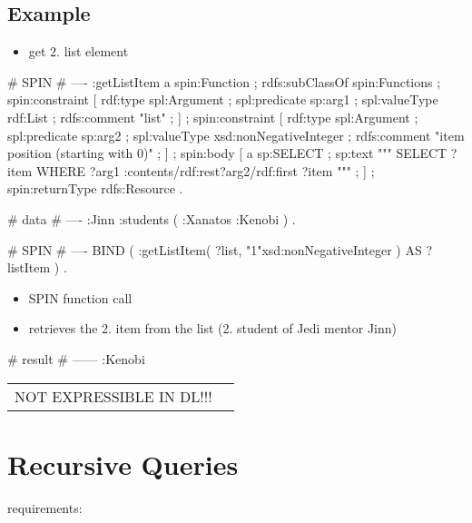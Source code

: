 \documentclass{llncs}
\newenvironment{DL}{
	\begin{center}
  \begin{tabular}{r l}

}{
  \end{tabular}
	\end{center}
}
\begin{document}
\subsection{Example}

\begin{itemize}
	\item get 2. list element
\end{itemize}

\begin{ex}
# SPIN
# ----
:getListItem
    a spin:Function ; rdfs:subClassOf spin:Functions ;
    spin:constraint [
        rdf:type spl:Argument ;
        spl:predicate sp:arg1 ;
        spl:valueType rdf:List ;
        rdfs:comment "list" ; ] ;
    spin:constraint [
        rdf:type spl:Argument ;
        spl:predicate sp:arg2 ;
        spl:valueType xsd:nonNegativeInteger ;
        rdfs:comment "item position (starting with 0)" ; ] ;
    spin:body [
        a sp:SELECT ;
        sp:text """
            SELECT ?item
            WHERE {
                ?arg1 :contents/rdf:rest{?arg2}/rdf:first ?item } """ ; ] ;
    spin:returnType rdfs:Resource .
\end{ex}

\begin{ex}
# data
# ----
:Jinn :students 
     ( :Xanatos :Kenobi ) . 
\end{ex}

\begin{ex}
# SPIN
# ----
BIND ( :getListItem( ?list, "1"xsd:nonNegativeInteger ) AS ?listItem ) .
\end{ex}

\begin{itemize}
  \item SPIN function call
	\item retrieves the 2. item from the list (2. student of Jedi mentor Jinn)
\end{itemize}

\begin{ex}
# result
# ------
:Kenobi
\end{ex}

\begin{DL}
NOT EXPRESSIBLE IN DL!!!
\end{DL}

\section{Recursive Queries}

requirements:
\end{document}

